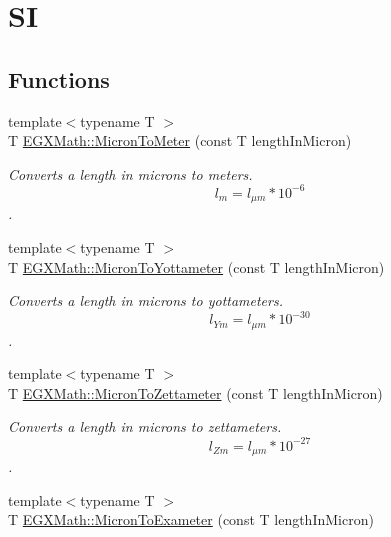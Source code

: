 \hypertarget{group___e_g_x_math-_conversions-_length_conversions-_non-_s_i-_micron-_s_i}{}\section{SI}
\label{group___e_g_x_math-_conversions-_length_conversions-_non-_s_i-_micron-_s_i}
\subsection*{Functions}
\begin{DoxyCompactItemize}
\item 
{\footnotesize template$<$typename T $>$ }\\T \mbox{\hyperlink{group___e_g_x_math-_conversions-_length_conversions-_non-_s_i-_micron-_s_i_gacbe71c60e4b4c0c2aebab6dbbe4b35c0}{E\+G\+X\+Math\+::\+Micron\+To\+Meter}} (const T length\+In\+Micron)
\begin{DoxyCompactList}\small\item\em Converts a length in microns to meters. \[ l_{m}=l_{\mu m} * 10^{-6} \]. \end{DoxyCompactList}\item 
{\footnotesize template$<$typename T $>$ }\\T \mbox{\hyperlink{group___e_g_x_math-_conversions-_length_conversions-_non-_s_i-_micron-_s_i_ga3510e5db7988e1fcaece5215a08eb485}{E\+G\+X\+Math\+::\+Micron\+To\+Yottameter}} (const T length\+In\+Micron)
\begin{DoxyCompactList}\small\item\em Converts a length in microns to yottameters. \[ l_{Ym}=l_{\mu m} * 10^{-30} \]. \end{DoxyCompactList}\item 
{\footnotesize template$<$typename T $>$ }\\T \mbox{\hyperlink{group___e_g_x_math-_conversions-_length_conversions-_non-_s_i-_micron-_s_i_gad70bec89cb8cae0a215e4f2c1b599c09}{E\+G\+X\+Math\+::\+Micron\+To\+Zettameter}} (const T length\+In\+Micron)
\begin{DoxyCompactList}\small\item\em Converts a length in microns to zettameters. \[ l_{Zm}=l_{\mu m} * 10^{-27} \]. \end{DoxyCompactList}\item 
{\footnotesize template$<$typename T $>$ }\\T \mbox{\hyperlink{group___e_g_x_math-_conversions-_length_conversions-_non-_s_i-_micron-_s_i_ga818e4c9f7eeb588ba87d5c16dba25fdd}{E\+G\+X\+Math\+::\+Micron\+To\+Exameter}} (const T length\+In\+Micron)

\end{DoxyCompactItemize}
